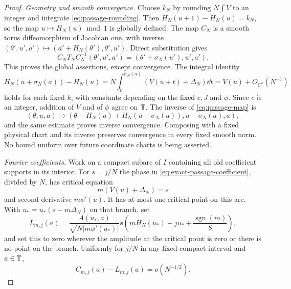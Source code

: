 \begin{proof}
\emph{Geometry and smooth convergence.}
Choose $k_N$ by rounding $N\int V$ to an integer and integrate
\eqref{eq:passage-rounding}. Then $H_N(u+1)-H_N(u)=k_N$, so the map
$u\mapsto H_N(u)\bmod1$ is globally defined. The map $C_N$ is a smooth
torus diffeomorphism of Jacobian one, with inverse
$(\theta',u',a')\mapsto(a'+H_N(\theta'),\theta',u')$.
Direct substitution gives
\[
 C_NT_NC_N^{-1}(\theta',u',a')
       =(\theta'+\sigma_N(u'),u',a').
\]
This proves the global assertions, except convergence. The integral
identity
\[
 H_N(u+\sigma_N(a))-H_N(u)
       =N\int_0^{\sigma_N(a)}(V(u+t)+\Delta_N)\dd t
       =V(u)+O_{C^k}(N^{-1})
\]
holds for each fixed $k$, with constants depending on the fixed $c,J$
and $\phi$. Since $c$ is an integer, addition of $V$ and of $\phi$ agree
on $\mathbb T$. The inverse of \eqref{eq:passage-map} is
\[
 (\theta,u,a)\longmapsto
 (\theta-H_N(u)+H_N(u-\sigma_N(a)),u-\sigma_N(a),a),
\]
and the same estimate proves inverse convergence. Composing with a
fixed physical chart and its inverse preserves convergence in every
fixed smooth norm. No bound uniform over future coordinate charts is
being asserted.

\emph{Fourier coefficients.}
Work on a compact
subarc of $I$ containing all old coefficient supports in its interior.
For $s=j/N$ the phase in \eqref{eq:exact-passage-coefficient}, divided
by $N$, has critical equation
\begin{equation}\label{eq:critical-equation}
 m(V(u)+\Delta_N)=s
\end{equation}
and second derivative $m\phi'(u)$. It has at most one critical point
on this arc. With $u_*=u_*(s-m\Delta_N)$ on that branch, set
\[
 L_{m,j}(a)=
 \frac{A(u_*,a)}{\sqrt{N|m\phi'(u_*)|}}
 \ee\left(mH_N(u_*)-ju_*+\frac{\operatorname{sgn}(m)}8\right),
\]
and set this to zero wherever the amplitude at the critical point is
zero or there is no point on the branch. Uniformly for $j/N$ in any
fixed compact interval and $a\in\mathbb T$,
\begin{equation}\label{eq:stationary-uniform}
 C_{m,j}(a)-L_{m,j}(a)=o(N^{-1/2}).
\end{equation}


\end{proof}
